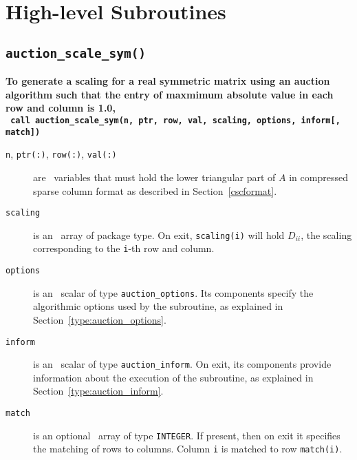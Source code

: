 
\section{High-level Subroutines}


\subsection{\texttt{auction\_scale\_sym()}}

\textbf{\noindent
   To generate a scaling for a real symmetric matrix using an auction algorithm such that the entry of maxmimum absolute value in each row and column is 1.0,
   \vspace*{0.1cm} \\
   \texttt{ \hspace*{0.2cm}
      call auction\_scale\_sym(n, ptr, row, val, scaling, options, inform[, match])
   }
   \vspace{0.3cm}
}

\begin{description}

\item[\texttt{n}, \texttt{ptr(:)}, \texttt{row(:)}, \texttt{val(:)}] are \intentin\ variables that must hold the lower triangular part of $A$ in compressed sparse column format as described in Section~\ref{cscformat}.

\item[\texttt{scaling}] is an \intentout\ array of package type. On exit,
\texttt{scaling(i)} will hold $D_{ii}$, the scaling corresponding to the
\texttt{i}-th row and column.

\item[\texttt{options}] is an \intentin\ scalar of type \texttt{auction\_options}. Its components specify the algorithmic options used by the subroutine, as explained in Section~\ref{type:auction_options}.

\item[\texttt{inform}] is an \intentout\ scalar of type \texttt{auction\_inform}. On exit, its components provide information about the execution of the subroutine, as explained in Section~\ref{type:auction_inform}.

\item[\texttt{match}] is an optional \intentout\ array of type {\tt INTEGER}.
If present, then on exit it specifies the matching of rows to columns.
Column \texttt{i} is matched to row \texttt{match(i)}.

\end{description}

